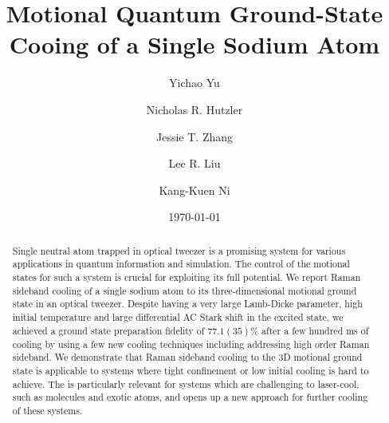 \documentclass[aps,prl,twocolumn,groupedaddress]{revtex4-1}
\begin{document}
\title{Motional Quantum Ground-State Cooing of a Single Sodium Atom}
\author{Yichao Yu}
\author{Nicholas R. Hutzler}
\author{Jessie T. Zhang}
\author{Lee R. Liu}
\author{Kang-Kuen Ni}

\date{\today}

\begin{abstract}
  Single neutral atom trapped in optical tweezer is a promising system for various applications
  in quantum information and simulation.
  The control of the motional states for such a system is crucial
  for exploiting its full potential.
  We report Raman sideband cooling of a single sodium atom to its three-dimensional
  motional ground state in an optical tweezer.
  Despite having a very large Lamb-Dicke parameter, high initial temperature and
  large differential AC Stark shift in the excited state,
  we achieved a ground state preparation fidelity of $77.1(35)\%$ after a few hundred ms of cooling
  by using a few new cooling techniques including addressing high order Raman sideband.
  We demonstrate that Raman sideband cooling to the 3D motional ground state is applicable to
  systems where tight confinement or low initial cooling is hard to achieve.
  The is particularly relevant for systems which are challenging to laser-cool,
  such as molecules and exotic atoms, and opens up a new approach for further cooling
  of these systems.
\end{abstract}

\maketitle
\end{document}
